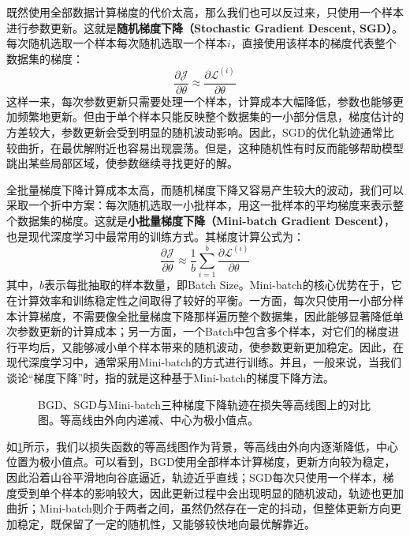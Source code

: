 既然使用全部数据计算梯度的代价太高，那么我们也可以反过来，只使用一个样本进行参数更新。这就是\textbf{随机梯度下降（Stochastic Gradient Descent, SGD）}。每次随机选取一个样本每次随机选取一个样本$i$，直接使用该样本的梯度代表整个数据集的梯度：
$$
\frac{\partial \mathcal{J}}{\partial \theta} \approx \frac{\partial \mathcal{L}^{(i)}}{\partial \theta}
$$
这样一来，每次参数更新只需要处理一个样本，计算成本大幅降低，参数也能够更加频繁地更新。但由于单个样本只能反映整个数据集的一小部分信息，梯度估计的方差较大，参数更新会受到明显的随机波动影响。因此，SGD的优化轨迹通常比较曲折，在最优解附近也容易出现震荡。但是，这种随机性有时反而能够帮助模型跳出某些局部区域，使参数继续寻找更好的解。

全批量梯度下降计算成本太高，而随机梯度下降又容易产生较大的波动，我们可以采取一个折中方案：每次随机选取一小批样本，用这一批样本的平均梯度来表示整个数据集的梯度。这就是\textbf{小批量梯度下降（Mini-batch Gradient Descent）}，也是现代深度学习中最常用的训练方式。其梯度计算公式为：
$$
\frac{\partial \mathcal{J}}{\partial \theta} \approx \frac{1}{b} \sum_{i=1}^{b} \frac{\partial \mathcal{L}^{(i)}}{\partial \theta}
$$
其中，$b$表示每批抽取的样本数量，即Batch Size。Mini-batch的核心优势在于，它在计算效率和训练稳定性之间取得了较好的平衡。一方面，每次只使用一小部分样本计算梯度，不需要像全批量梯度下降那样遍历整个数据集，因此能够显著降低单次参数更新的计算成本；另一方面，一个Batch中包含多个样本，对它们的梯度进行平均后，又能够减小单个样本带来的随机波动，使参数更新更加稳定。因此，在现代深度学习中，通常采用Mini-batch的方式进行训练。并且，一般来说，当我们谈论“梯度下降”时，指的就是这种基于Mini-batch的梯度下降方法。

\begin{figure}[H]
    \caption{BGD、SGD与Mini-batch三种梯度下降轨迹在损失等高线图上的对比图。等高线由外向内递减、中心为极小值点。}
    \label{fig:comparison_of_batching_strategies}
\end{figure}

如\cref{fig:comparison_of_batching_strategies}所示，我们以损失函数的等高线图作为背景，等高线由外向内逐渐降低，中心位置为极小值点。可以看到，BGD使用全部样本计算梯度，更新方向较为稳定，因此沿着山谷平滑地向谷底逼近，轨迹近乎直线；SGD每次只使用一个样本，梯度受到单个样本的影响较大，因此更新过程中会出现明显的随机波动，轨迹也更加曲折；Mini-batch则介于两者之间，虽然仍然存在一定的抖动，但整体更新方向更加稳定，既保留了一定的随机性，又能够较快地向最优解靠近。

